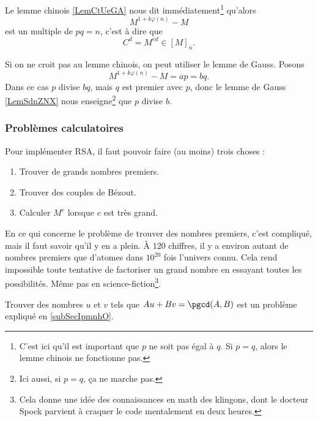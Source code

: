 Le lemme chinois \ref{LemCtUeGA} nous dit immédiatement\footnote{C'est ici qu'il est important que \( p\) ne soit pas égal à \( q\). Si \( p=q\), alors le lemme chinois ne fonctionne pas.} qu'alors
\begin{equation}
    M^{1+k\varphi(n)}-M
\end{equation}
est un multiple de \( pq=n\), c'est à dire que
\begin{equation}
    C^d=M^{ed}\in [M]_n.
\end{equation}

Si on ne croit pas au lemme chinois, on peut utiliser le lemme de Gauss. Posons
\begin{equation}
    M^{1+k\varphi(n)}-M=ap=bq.
\end{equation}
Dans ce cas \( p\) divise \( bq\), mais \( q\) est premier avec \( p\), donc le lemme de Gauss \ref{LemSdnZNX} nous enseigne\footnote{Ici aussi, si \( p=q\), ça ne marche pas.} que \( p\) divise \( b\).

\subsubsection{Problèmes calculatoires}

Pour implémenter RSA, il faut pouvoir faire (au moins) trois choses :
\begin{enumerate}
    \item
        Trouver de grands nombres premiers.
    \item
        Trouver des couples de Bézout.
    \item
        Calculer \( M^e\) lorsque \( e\) est très grand.
\end{enumerate}
En ce qui concerne le problème de trouver des nombres premiers, c'est compliqué, mais il faut savoir qu'il y en a plein. À \( 120\) chiffres, il y a environ autant de nombres premiers que d'atomes dans \( 10^{20}\) fois l'univers connu. Cela rend impossible toute tentative de factoriser un grand nombre en essayant toutes les possibilités. Même pas en science-fiction\footnote{Cela donne une idée des connaissances en math des klingons, dont le docteur Spock parvient à craquer le code mentalement en deux heures.}.

Trouver des nombres \( u\) et \( v\) tels que \( Au+Bv=\pgcd(A,B)\) est un problème expliqué en \ref{subSecIpmnhO}.

